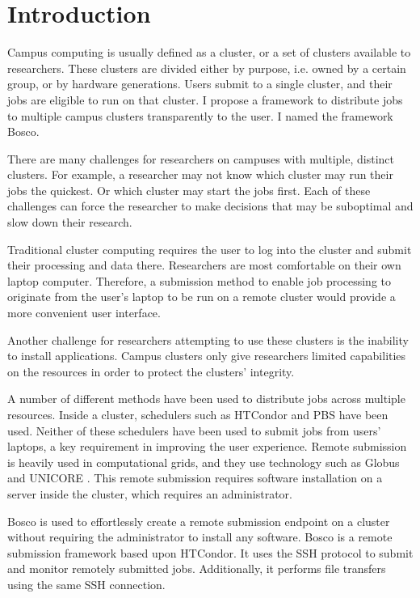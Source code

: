 \label{chapter:campusjobs} 
\section{Introduction}

Campus computing is usually defined as a cluster, or a set of clusters available to researchers.  These clusters are divided either by purpose, i.e. owned by a certain group, or by hardware generations.  Users submit to a single cluster, and their jobs are eligible to run on that cluster.  I propose a framework to distribute jobs to multiple campus clusters transparently to the user.  I named the framework Bosco.  

There are many challenges for researchers on campuses with multiple, distinct clusters.  For example, a researcher may not know which cluster may run their jobs the quickest.  Or which cluster may start the jobs first.  Each of these challenges can force the researcher to make decisions that may be suboptimal and slow down their research.

Traditional cluster computing requires the user to log into the cluster and submit their processing and data there. Researchers are most comfortable on their own laptop computer.  Therefore, a submission method to enable job processing to originate from the user's laptop to be run on a remote cluster would provide a more convenient user interface.

Another challenge for researchers attempting to use these clusters is the inability to install applications.  Campus clusters only give researchers limited capabilities on the resources in order to protect the clusters' integrity.

A number of different methods have been used to distribute jobs across multiple resources.  Inside a cluster, schedulers such as HTCondor  \cite{litzkow1988condor} and PBS \cite{henderson1995job} have been used.  Neither of these schedulers have been used to submit jobs from users' laptops, a key requirement in improving the user experience.  Remote submission is heavily used in computational grids, and they use technology such as Globus \cite{foster2001globus} and UNICORE \cite{romberg2002unicore}. This remote submission requires software installation on a server inside the cluster, which requires an administrator.

Bosco \cite{weitzel2014accessing} is used to effortlessly create a remote submission endpoint on a cluster without requiring the administrator to install any software.  Bosco is a remote submission framework based upon HTCondor.  It uses the SSH \cite{ylonen2006secure} protocol to submit and monitor remotely submitted jobs.  Additionally, it performs file transfers using the same SSH connection.

